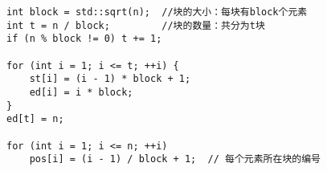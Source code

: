 \begin{lstlisting}
int block = std::sqrt(n);  //块的大小：每块有block个元素
int t = n / block;         //块的数量：共分为t块
if (n % block != 0) t += 1;

for (int i = 1; i <= t; ++i) {
	st[i] = (i - 1) * block + 1;
	ed[i] = i * block;
}
ed[t] = n;

for (int i = 1; i <= n; ++i) 
	pos[i] = (i - 1) / block + 1;  // 每个元素所在块的编号
\end{lstlisting}